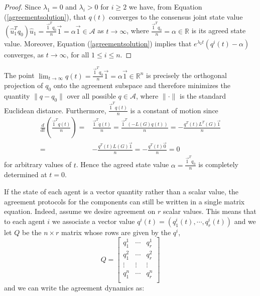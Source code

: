 \documentclass{aims}
\theoremstyle{definition}
\begin{document}
\begin{proof}
Since $\lambda_1=0$ and $\lambda_i>0$ for $i\geq 2$ we have,
from Equation (\ref{agreementsolution}), that
$q(t)$ converges to the consensus joint state value 
$(\hat{u}^{T}_1 q_0)\hat{u}_1=\frac{\vec 1^{T}q_0}{n}\vec 1=\alpha\vec 1\in \mathcal{A}$ as $t\rightarrow\infty$,
where $\frac{\vec 1^{T}q_0}{n}=\alpha\in\mathbb{R}$ is its agreed state value. Moreover, Equation (\ref{agreementsolution}) implies that
$e^{\lambda_2 t}(q^i(t)-\alpha)$ converges, as $t\rightarrow\infty$, for all $1\leq i\leq n$.
\end{proof}
The point $\displaystyle\lim_{t\rightarrow\infty}q(t)=\frac{\vec 1^{T}q_0}{n}\vec 1=\alpha\vec 1\in\mathbb{R}^n$ is precisely
the orthogonal projection of $q_0$ onto the agreement subspace
and therefore minimizes the quantity $\lVert q-q_0\rVert$ over all possible $q\in \mathcal{A}$,
where $\lVert \cdot\rVert$ is the standard Euclidean distance.
Furthermore, $\frac{\vec 1^{T}q(t)}{n}$ is a constant of motion since
\begin{align}
\frac{d}{dt}\left(\frac{\vec 1^{T}q(t)}{n}\right)= & \frac{\vec 1^{T}\dot{q}(t)}{n}=\frac{\vec 1^{T}(-L(G)q(t))}{n}
=-\frac{q^T(t)L^T(G)\vec{1}}{n}\\= & -\frac{q^T(t)L(G)\vec{1}}{n}=-\frac{q^T(t)\vec{0}}{n}=0
\end{align}
for arbitrary values of $t$. Hence the agreed state value $\alpha=\frac{\vec 1^{T}q_0}{n}$ is completely determined at $t=0$. 

If the state of each agent is a vector quantity rather than a scalar value, the agreement protocols for the components can still be written in a single matrix equation. Indeed, assume we desire agreement on $r$ scalar values. This means that to each agent $i$ we associate a vector value $q^i(t)=(q_1^i(t),\cdots,q_r^i(t))$ and we let $Q$ be the $n\times r$ matrix whose rows are given by the $q^i$,
\begin{equation}
    Q=\left[\begin{array}{ccc}
    q_1^1&\cdots&q_r^1\\
    q_1^2&\cdots&q_r^2\\
    \vdots & \vdots& \vdots\\
    q_1^n&\cdots&q_r^n\\
    \end{array}\right]
\end{equation}
and we can write the agreement dynamics as:
\end{document}
